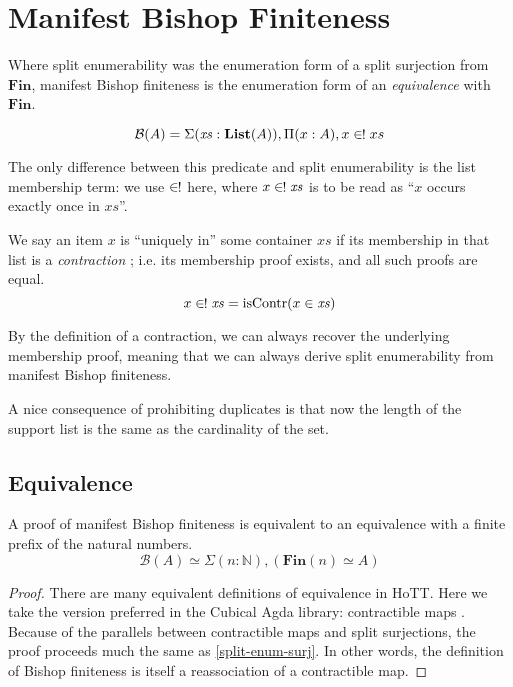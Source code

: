 \section{Manifest Bishop Finiteness} \label{manifest-bishop}
Where split enumerability was the enumeration form of a split surjection from
\(\mathbf{Fin}\), manifest Bishop finiteness is the enumeration form of an
\emph{equivalence} with \(\mathbf{Fin}\).

\begin{rm-definition}
  \begin{equation}
    \mathcal{B}(A) = \Sigma {(\mathit{xs} : \textbf{List}(A))} , \Pi {(x : A)} , x \inunique xs
  \end{equation}
\end{rm-definition}
The only difference between this predicate and split enumerability is the list
membership term: we use \(\inunique\) here, where \(x \inunique \mathit{xs}\) is
to be read as ``\(x\) occurs exactly once in \(\mathit{xs}\)''.
\begin{rm-definition}
  We say an item \(x\) is ``uniquely in'' some container \(\mathit{xs}\) if its
  membership in that list is a \emph{contraction} \cite[definition
  3.11.1]{hottbook}; i.e. its membership proof exists, and all such proofs are
  equal.
  \begin{equation}
    x \inunique \mathit{xs} = \text{isContr}(x \in \mathit{xs})
  \end{equation}
\end{rm-definition}
By the definition of a contraction, we can always recover the underlying
membership proof, meaning that we can always derive split enumerability from
manifest Bishop finiteness.

A nice consequence of prohibiting duplicates is that now the length of the
support list is the same as the cardinality of the set.
\subsection{Equivalence}
\begin{rm-lemma} \label{bishop-equiv}
  A proof of manifest Bishop finiteness is equivalent to an equivalence with a
  finite prefix of the natural numbers.
  \begin{equation}
    \mathcal{B}(A) \simeq \Sigma {(n : \mathbb{N})} , \left( \mathbf{Fin}(n) \simeq A \right)
  \end{equation}
\end{rm-lemma}
\begin{proof}
  There are many equivalent definitions of equivalence in HoTT.
  Here we take the version preferred in the Cubical Agda library: contractible
  maps \cite[definition 4.4.1]{hottbook}.
  Because of the parallels between contractible maps and split surjections,
  the proof proceeds much the same as \ref{split-enum-surj}.
  In other words, the definition of Bishop finiteness is itself a reassociation
  of a contractible map.
\end{proof}
